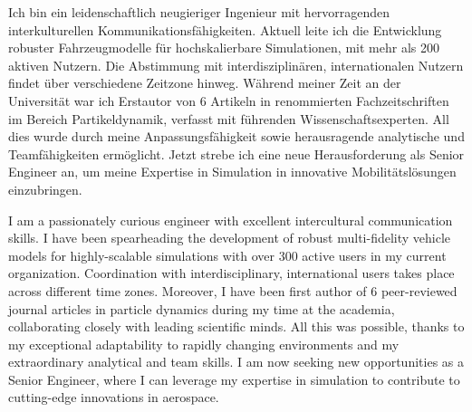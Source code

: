 \documentclass{mycv}
\begin{document}
{\rlap{\color{templateColor4}\rule[0mm]{\textwidth}{\ulinewidth}}}
\setlength{\columnsep}{2.5em}
\setlength{\columnseprule}{\ulinewidth}
\begin{paracol}{2}
    {

        Ich bin ein leidenschaftlich neugieriger Ingenieur mit hervorragenden
        interkulturellen Kommunikationsf{\"a}higkeiten. Aktuell leite ich die
        Entwicklung robuster Fahrzeugmodelle für hochskalierbare Simulationen,
        mit mehr als 200 aktiven Nutzern. Die Abstimmung mit
        interdisziplin{\"a}ren, internationalen Nutzern findet {\"u}ber
        verschiedene Zeitzone hinweg. Während meiner Zeit an der Universität
        war ich Erstautor von 6 Artikeln in renommierten Fachzeitschriften im
        Bereich Partikeldynamik, verfasst mit führenden Wissenschaftsexperten.
        All dies wurde durch meine Anpassungsfähigkeit sowie herausragende
        analytische und Teamfähigkeiten ermöglicht. Jetzt strebe ich eine neue
        Herausforderung als Senior Engineer an, um meine Expertise in
        Simulation in innovative Mobilit{\"a}tsl{\"o}sungen einzubringen.\\

    } 
    { 


        I am a passionately curious engineer with excellent intercultural
        communication skills. I have been spearheading the development of
        robust multi-fidelity vehicle models for highly-scalable simulations
        with over 300 active users in my current organization. Coordination
        with interdisciplinary, international users takes place across
        different time zones. Moreover, I have been first author of 6
        peer-reviewed journal articles in particle dynamics during my time at
        the academia, collaborating closely with leading scientific minds. All
        this was possible, thanks to my exceptional adaptability to rapidly
        changing environments and my extraordinary analytical and team skills.
        I am now seeking new opportunities as a Senior 
        Engineer, where I can leverage my expertise in simulation to contribute
        to cutting-edge innovations in aerospace.\\

    }


\end{paracol}
\end{document}
